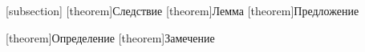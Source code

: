 \theoremstyle{plain}
[subsection]
[theorem]{Следствие}
[theorem]{Лемма}
[theorem]{Предложение}

\theoremstyle{definition}
[theorem]{Определение}
[theorem]{Замечение}


\theoremstyle{definition}
\newtheorem*{example}{Пример}
\newtheorem*{notation}{Нотация}
